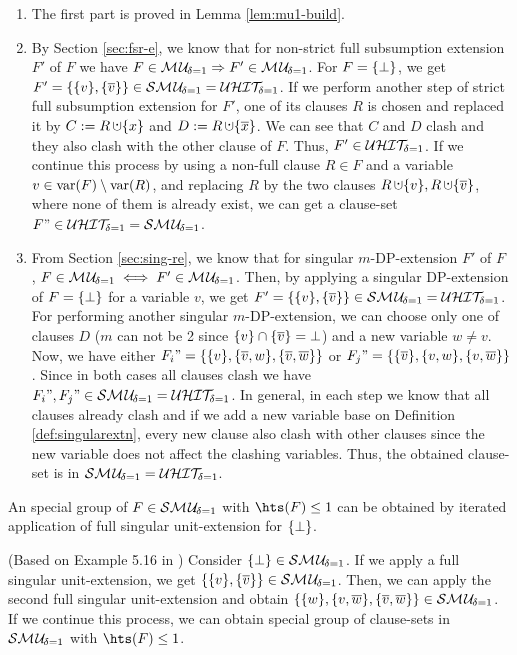 \documentclass{report}
\begin{document}
\begin{prf}
  \begin{enumerate}
  \item The first part is proved in Lemma \ref{lem:mu1-build}.          
  \item By Section \ref{sec:fsr-e}, we know that for non-strict full subsumption extension $F'$ of $F$ we have $F \in  \mathcal{M\hspace{0.8pt}U}_{\!\delta=1} \Rightarrow F' \in \mathcal{M\hspace{0.8pt}U}_{\!\delta=1}$. For  $F=\{ \bot \}$, we get $F'=\{ \{ v \},\{ \overline v \} \} \in \mathcal{S}\mathcal{M\hspace{0.8pt}U}_{\!\delta=1} = \mathcal{U}\mathcal{HIT}_{\!\!\delta=1}$. If we perform another step of strict full subsumption extension for $F'$, one of its clauses $R$ is chosen and replaced it by $C := R \addcup \set{x}$ and $D := R \addcup \set{\ol{x}}$. We can see that $C$ and $D$ clash and  they also clash with the other clause of $F$. Thus, $F' \in \mathcal{U}\mathcal{HIT}_{\!\!\delta=1}$. If we continue this process by using a non-full clause $R \in F$ and a variable $v \in \operatorname{var}(F) \setminus \operatorname{var}(R)$, and replacing $R$ by the two clauses $R \addcup \set{v}, R \addcup \set{\ol{v}}$, where none of them is already exist, we can get a clause-set $F" \in \mathcal{U}\mathcal{HIT}_{\!\!\delta=1}=\mathcal{S}\mathcal{M\hspace{0.8pt}U}_{\!\delta=1}$.    
  \item From Section \ref{sec:sing-re}, we know that for singular $m$-DP-extension $F'$ of $F$ , $F \in \mathcal{M\hspace{0.8pt}U}_{\!\delta=1} \iff F' \in \mathcal{M\hspace{0.8pt}U}_{\!\delta=1}$. Then, by applying a singular DP-extension of $F=\{ \bot \}$ for a variable $v$, we get $F'=\{ \{ v \},\{ \overline v \} \} \in \mathcal{S}\mathcal{M\hspace{0.8pt}U}_{\!\delta=1} = \mathcal{U}\mathcal{HIT}_{\!\!\delta=1}$. For performing another  singular $m$-DP-extension, we can choose only one of clauses $D$ ($m$ can not be 2 since $\{ v \} \cap \{ \overline v \}=\bot $) and a new variable $w \not = v$. Now, we have either $F_i"=\{ \{ v \},\{ \overline v, w \},\{ \overline v,\overline w \} \}$ or $F_j"=\{ \{ \overline v \},\{  v, w \},\{  v,\overline w \} \}$. Since in both cases all clauses clash we have $F_i",F_j" \in \mathcal{S}\mathcal{M\hspace{0.8pt}U}_{\!\delta=1} = \mathcal{U}\mathcal{HIT}_{\!\!\delta=1}$. In general, in each step we know that all clauses already clash and if we add a new variable base on Definition \ref{def:singularextn}, every new clause also clash with other clauses since the new variable does not affect the clashing variables. Thus, the obtained clause-set is in $\mathcal{S}\mathcal{M\hspace{0.8pt}U}_{\!\delta=1} = \mathcal{U}\mathcal{HIT}_{\!\!\delta=1}$.
  \end{enumerate}
\end{prf}

\begin{lem}\label{lem:mu1-strc}
An special group of $F \in \mathcal{S}\mathcal{M\hspace{0.8pt}U}_{\!\delta=1}$ with $\hts(F) \le 1$ can be obtained by iterated application of full singular unit-extension for $\{ \bot \}$.
\end{lem}
\begin{prf}
(Based on Example 5.16 in \cite{KullmannZhao2010Extremal}) Consider $\{ \bot \} \in \mathcal{S}\mathcal{M\hspace{0.8pt}U}_{\!\delta=1}$. If we apply a full singular unit-extension, we get $\{ \{ v \},\{ \overline{v} \} \} \in \mathcal{S}\mathcal{M\hspace{0.8pt}U}_{\!\delta=1}$. Then, we can apply the second full singular unit-extension and obtain $\{ \{ w \},\{ v,\overline{w} \},\{ \overline{v},\overline{w} \} \}\in \mathcal{S}\mathcal{M\hspace{0.8pt}U}_{\!\delta=1}$. If we continue this process, we can obtain special group of clause-sets in $\mathcal{S}\mathcal{M\hspace{0.8pt}U}_{\!\delta=1}$ with $\hts(F) \le 1$.
\end{prf}
\end{document}
